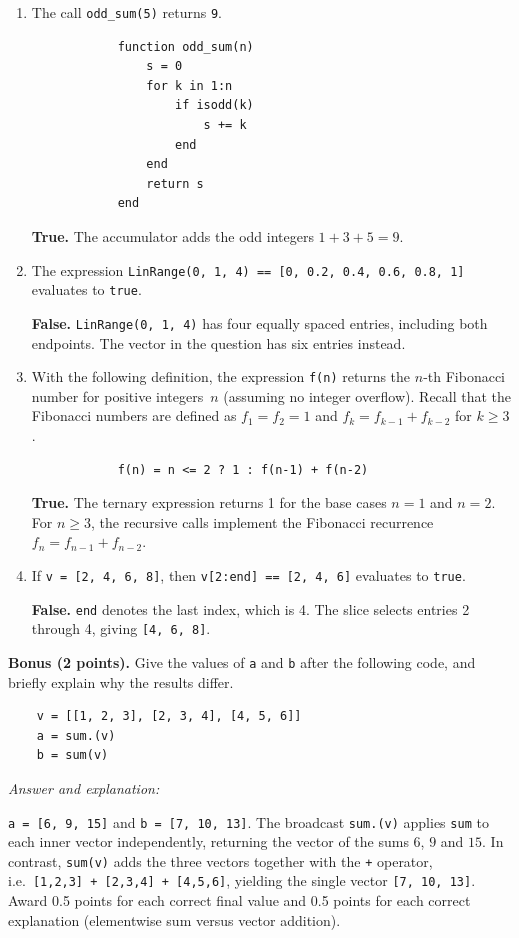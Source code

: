 \documentclass[a4paper]{article}
\newcommand{\julia}[1]{\texttt{#1}}
\newcommand{\answer}[1]{%
    \ifdefined\showsolutions
        \par\smallskip
        {\small\color{blue!60!black}#1\par}
    \fi
}
\begin{document}
\newpage
\begin{enumerate}[resume,itemsep=8pt]
    \item
        The call \julia{odd_sum(5)} returns \julia{9}.
        \begin{verbatim}
            function odd_sum(n)
                s = 0
                for k in 1:n
                    if isodd(k)
                        s += k
                    end
                end
                return s
            end
        \end{verbatim}
        \answer{\textbf{True.}
        The accumulator adds the odd integers $1+3+5=9$.}

    \item
        The expression \julia{LinRange(0, 1, 4) == [0, 0.2, 0.4, 0.6, 0.8, 1]}
        evaluates to \julia{true}.
        \answer{\textbf{False.}
        \julia{LinRange(0, 1, 4)} has four equally spaced
        entries, including both endpoints.
        The vector in the question has six entries instead.}

    \item
        With the following definition, the expression \julia{f(n)} returns
        the $n$-th Fibonacci number for positive integers~$n$
        (assuming no integer overflow).
        Recall that the Fibonacci numbers are defined as
        $f_1=f_2=1$ and $f_k=f_{k-1}+f_{k-2}$ for $k\geq3$.
        \begin{verbatim}
            f(n) = n <= 2 ? 1 : f(n-1) + f(n-2)
        \end{verbatim}
        \answer{\textbf{True.}
        The ternary expression returns 1 for the base cases
        $n=1$ and $n=2$. For $n\geq3$, the recursive calls implement
        the Fibonacci recurrence $f_n=f_{n-1}+f_{n-2}$.}

    \item
        If \julia{v = [2, 4, 6, 8]}, then \julia{v[2:end] == [2, 4, 6]} evaluates to \julia{true}.
        \answer{\textbf{False.}
        \julia{end} denotes the last index, which is 4.
        The slice selects entries 2 through 4, giving \julia{[4, 6, 8]}.}
\end{enumerate}

\noindent\textbf{Bonus (2 points).}
Give the values of \julia{a} and \julia{b} after the following code,
and briefly explain why the results differ.
\begin{verbatim}
    v = [[1, 2, 3], [2, 3, 4], [4, 5, 6]]
    a = sum.(v)
    b = sum(v)
\end{verbatim}
\noindent\textit{Answer and explanation:}
\ifdefined\showsolutions\else\vspace{2cm}\fi
\answer{\julia{a = [6, 9, 15]} and \julia{b = [7, 10, 13]}.
The broadcast \julia{sum.(v)} applies \julia{sum} to each inner vector
independently, returning the vector of the sums $6$, $9$ and $15$.
In contrast, \julia{sum(v)} adds the three vectors together with the
\julia{+} operator, i.e.\ \julia{[1,2,3] + [2,3,4] + [4,5,6]},
yielding the single vector \julia{[7, 10, 13]}.
Award 0.5 points for each correct final value and 0.5 points for each
correct explanation (elementwise sum versus vector addition).}
\end{document}
